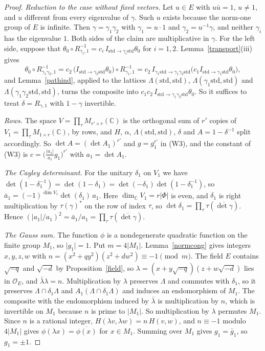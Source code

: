 \begin{proof}
\emph{Reduction to the case without fixed vectors.} Let $u\in E$ with $u\bar u=1$, $u\ne1$, and $u$ different from every eigenvalue of $\gamma$. Such $u$ exists because the norm-one group of $E$ is infinite. Then $\gamma=\gamma_1\gamma_2$ with $\gamma_1=u\cdot1$ and $\gamma_2=u^{-1}\gamma$, and neither $\gamma_i$ has the eigenvalue $1$. Both sides of the claim are multiplicative in $\gamma$. For the left side, suppose that $\theta_0\circ R_{\gamma_i,1}^{-1}=c_i\,I_{\mathrm{std}\to\gamma_i\mathrm{std}}\theta_0$ for $i=1,2$. Lemma~\ref{transport}(iii) gives
\[
\theta_0\circ R_{\gamma_1\gamma_2,1}^{-1}=c_2\,\big(I_{\mathrm{std}\to\gamma_2\mathrm{std}}\theta_0\big)\circ R_{\gamma_1,1}^{-1}=c_2\,I_{\gamma_1\mathrm{std}\to\gamma_1\gamma_2\mathrm{std}}\big(c_1I_{\mathrm{std}\to\gamma_1\mathrm{std}}\theta_0\big),
\]
and Lemma~\ref{pathind}, applied to the lattices $\Lambda(\mathrm{std},\mathrm{std})$, $\Lambda(\gamma_1\mathrm{std},\mathrm{std})$ and $\Lambda(\gamma_1\gamma_2\mathrm{std},\mathrm{std})$, turns the composite into $c_1c_2\,I_{\mathrm{std}\to\gamma_1\gamma_2\mathrm{std}}\theta_0$. So it suffices to treat $\delta=R_{\gamma,1}$ with $1-\gamma$ invertible.

\emph{Rows.} The space $V=\prod_\tau M_{r'\times r}(\mathbb C)$ is the orthogonal sum of $r'$ copies of $V_1=\prod_\tau M_{1\times r}(\mathbb C)$, by rows, and $H$, $\alpha$, $\Lambda(\mathrm{std},\mathrm{std})$, $\delta$ and $A=1-\delta^{-1}$ split accordingly. So $\det A=(\det A_1)^{r'}$ and $g=g_1^{r'}$ in (W3), and the constant of (W3) is $c=\big(\frac{\lvert a_1\rvert}{a_1}g_1\big)^{r'}$ with $a_1=\det A_1$.

\emph{The Cayley determinant.} For the unitary $\delta_1$ on $V_1$ we have $\overline{\det(1-\delta_1^{-1})}=\det(1-\delta_1)=\det(-\delta_1)\det(1-\delta_1^{-1})$, so $\bar a_1=(-1)^{\dim V_1}\det(\delta_1)\,a_1$. Here $\dim_{\mathbb C}V_1=r\lvert\Phi\rvert$ is even, and $\delta_1$ is right multiplication by $\tau(\gamma)^\ast$ on the row of index $\tau$, so $\det\delta_1=\prod_\tau\tau(\overline{\det\gamma})$. Hence $(\lvert a_1\rvert/a_1)^2=\bar a_1/a_1=\prod_\tau\tau(\overline{\det\gamma})$.

\emph{The Gauss sum.} The function $\phi$ is a nondegenerate quadratic function on the finite group $M_1$, so $\lvert g_1\rvert=1$. Put $m=4\lvert M_1\rvert$. Lemma~\ref{normcong} gives integers $x,y,z,w$ with $n=(x^2+qy^2)(z^2+dw^2)\equiv-1\pmod m$. The field $E$ contains $\sqrt{-q}$ and $\sqrt{-d}$ by Proposition~\ref{field}, so $\lambda=(x+y\sqrt{-q})(z+w\sqrt{-d})$ lies in $\mathcal O_E$, and $\bar\lambda\lambda=n$. Multiplication by $\lambda$ preserves $\Lambda$ and commutes with $\delta_1$, so it preserves $\Lambda\cap\delta_1\Lambda$ and $A_1(\Lambda\cap\delta_1\Lambda)$ and induces an endomorphism of $M_1$. The composite with the endomorphism induced by $\bar\lambda$ is multiplication by $n$, which is invertible on $M_1$ because $n$ is prime to $\lvert M_1\rvert$. So multiplication by $\lambda$ permutes $M_1$. Since $n$ is a rational integer, $H(\lambda v,\lambda w)=n\,H(v,w)$, and $n\equiv-1$ modulo $4\lvert M_1\rvert$ gives $\phi(\lambda x)=\overline{\phi(x)}$ for $x\in M_1$. Summing over $M_1$ gives $g_1=\bar g_1$, so $g_1=\pm1$.


\end{proof}
